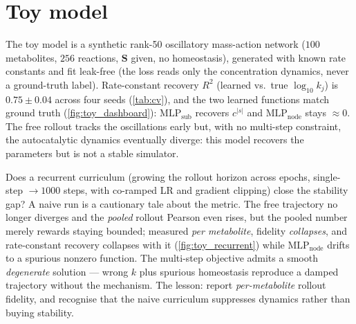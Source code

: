 \documentclass[11pt]{article}
\begin{document}
\section{Toy model}
\label{sec:toy}

The toy model is a synthetic rank-50 oscillatory mass-action network ($100$
metabolites, $256$ reactions, $\mathbf{S}$ given, no homeostasis), generated with
known rate constants and fit leak-free (the loss reads only the concentration
dynamics, never a ground-truth label). Rate-constant recovery $R^2$ (learned vs.\
true $\log_{10} k_j$) is $0.75 \pm 0.04$ across four seeds (\cref{tab:cv}), and the
two learned functions match ground truth (\cref{fig:toy_dashboard}): $\mathrm{MLP_{sub}}$
recovers $c^{|s|}$ and $\mathrm{MLP_{node}}$ stays $\approx 0$. The free rollout tracks the
oscillations early but, with no multi-step constraint, the autocatalytic dynamics
eventually diverge: this model recovers the parameters but is not a stable simulator.

Does a recurrent curriculum (growing the rollout horizon across epochs, single-step
$\to 1000$ steps, with co-ramped LR and gradient clipping) close the stability gap? A
naive run is a cautionary tale about the metric. The free trajectory no longer diverges
and the \emph{pooled} rollout Pearson even rises, but the pooled number merely rewards
staying bounded; measured \emph{per metabolite}, fidelity \emph{collapses}, and
rate-constant recovery collapses with it (\cref{fig:toy_recurrent}) while
$\mathrm{MLP_{node}}$ drifts to a spurious nonzero function. The multi-step objective admits a
smooth \emph{degenerate} solution --- wrong $k$ plus spurious homeostasis reproduce a damped
trajectory without the mechanism. The lesson: report \emph{per-metabolite} rollout fidelity,
and recognise that the naive curriculum suppresses dynamics rather than buying stability.
\end{document}
